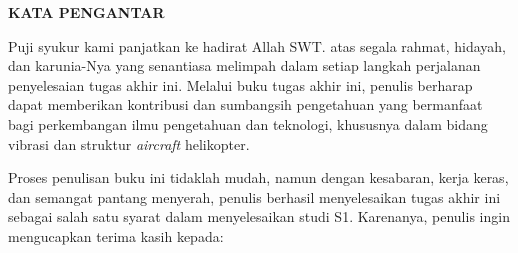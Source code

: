 \thispagestyle{newchap}
\begin{center}
  \Large
  \textbf{KATA PENGANTAR}
\end{center}


\vspace{2ex}

Puji syukur kami panjatkan ke hadirat Allah SWT. atas segala rahmat, hidayah, dan karunia-Nya yang senantiasa melimpah dalam setiap langkah perjalanan penyelesaian tugas akhir ini. Melalui buku tugas akhir ini, penulis berharap dapat memberikan kontribusi dan sumbangsih pengetahuan yang bermanfaat bagi perkembangan ilmu pengetahuan dan teknologi, khususnya dalam bidang vibrasi dan struktur \textit{aircraft} helikopter. 

Proses penulisan buku ini tidaklah mudah, namun dengan kesabaran, kerja keras, dan semangat pantang menyerah, penulis berhasil menyelesaikan tugas akhir ini sebagai salah satu syarat dalam menyelesaikan studi S1. Karenanya, penulis ingin mengucapkan terima kasih kepada:


